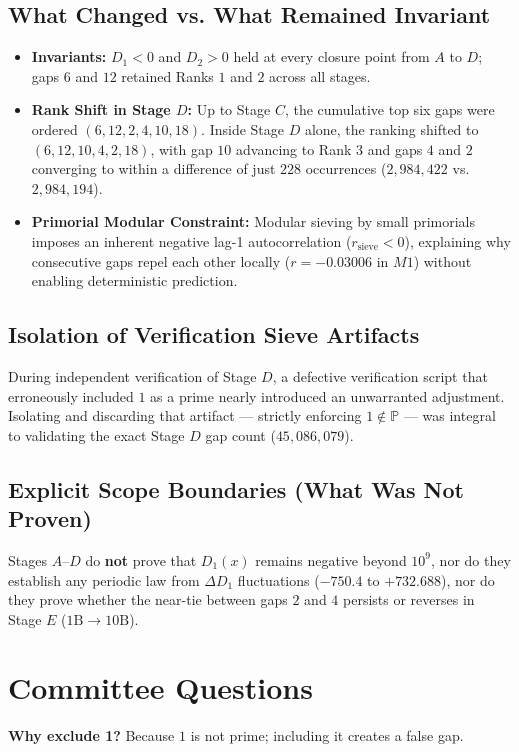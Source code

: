 \documentclass[12pt,a4paper]{article}
\begin{document}
\subsection{What Changed vs. What Remained Invariant}
\begin{itemize}
\item \textbf{Invariants:} $D_1 < 0$ and $D_2 > 0$ held at every closure point from $A$ to $D$; gaps $6$ and $12$ retained Ranks $1$ and $2$ across all stages.
\item \textbf{Rank Shift in Stage $D$:} Up to Stage $C$, the cumulative top six gaps were ordered $(6, 12, 2, 4, 10, 18)$. Inside Stage $D$ alone, the ranking shifted to $(6, 12, 10, 4, 2, 18)$, with gap $10$ advancing to Rank $3$ and gaps $4$ and $2$ converging to within a difference of just $228$ occurrences ($2{,}984{,}422$ vs. $2{,}984{,}194$).
\item \textbf{Primorial Modular Constraint:} Modular sieving by small primorials imposes an inherent negative lag-1 autocorrelation ($r_{\text{sieve}} < 0$), explaining why consecutive gaps repel each other locally ($r = -0.03006$ in $M1$) without enabling deterministic prediction.
\end{itemize}
\subsection{Isolation of Verification Sieve Artifacts}
During independent verification of Stage $D$, a defective verification script that erroneously included $1$ as a prime nearly introduced an unwarranted adjustment. Isolating and discarding that artifact — strictly enforcing $1 \notin \mathbb{P}$ — was integral to validating the exact Stage $D$ gap count ($45{,}086{,}079$).
\subsection{Explicit Scope Boundaries (What Was Not Proven)}
Stages $A$--$D$ do \textbf{not} prove that $D_1(x)$ remains negative beyond $10^9$, nor do they establish any periodic law from $\Delta D_1$ fluctuations ($-750.4$ to $+732.688$), nor do they prove whether the near-tie between gaps $2$ and $4$ persists or reverses in Stage $E$ ($1\text{B} \rightarrow 10\text{B}$).

\section{Committee Questions}
\textbf{Why exclude 1?} Because $1$ is not prime; including it creates a false gap.
\end{document}

